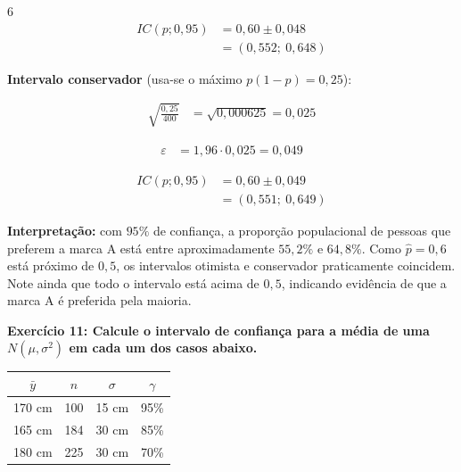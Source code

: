 \documentclass[8pt, a4paper, landscape]{extarticle}
\begin{document}
\begin{multicols}{6}
\begin{equation*}
\begin{split}
IC(p;0,95) &= 0,60 \pm 0,048 \\
&= (0,552;\ 0,648)
\end{split}
\end{equation*}

\vspace{0.2cm}

\textbf{Intervalo conservador} (usa-se o máximo $p(1-p) = 0,25$):

\begin{equation*}
\begin{split}
\sqrt{\frac{0,25}{400}} &= \sqrt{0,000625} = 0,025
\end{split}
\end{equation*}

\begin{equation*}
\begin{split}
\varepsilon &= 1,96 \cdot 0,025 = 0,049
\end{split}
\end{equation*}

\begin{equation*}
\begin{split}
IC(p;0,95) &= 0,60 \pm 0,049 \\
&= (0,551;\ 0,649)
\end{split}
\end{equation*}

\textbf{Interpretação:} com $95\%$ de confiança, a proporção populacional de pessoas que preferem a marca A está entre aproximadamente $55,2\%$ e $64,8\%$. Como $\hat{p} = 0,6$ está próximo de $0,5$, os intervalos otimista e conservador praticamente coincidem. Note ainda que todo o intervalo está acima de $0,5$, indicando evidência de que a marca A é preferida pela maioria.

\textbf{Exercício 11: Calcule o intervalo de confiança para a média de uma $N(\mu, \sigma^2)$ em cada um dos casos abaixo.}

\begin{center}
\small
\begin{tabular}{cccc}
\hline
$\bar{y}$ & $n$ & $\sigma$ & $\gamma$ \\
\hline
170 cm & 100 & 15 cm & 95\% \\
165 cm & 184 & 30 cm & 85\% \\
180 cm & 225 & 30 cm & 70\% \\
\hline
\end{tabular}
\end{center}


\end{multicols}
\end{document}
